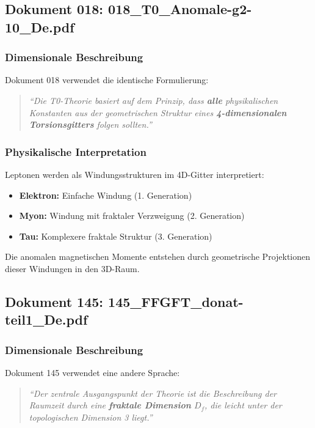 	\subsection{Dokument 018: 018\_T0\_Anomale-g2-10\_De.pdf}
	
	\subsubsection{Dimensionale Beschreibung}
	
	Dokument 018 verwendet die identische Formulierung:
	
	\begin{quote}
		\textit{\enquote{Die T0-Theorie basiert auf dem Prinzip, dass \textbf{alle} physikalischen Konstanten aus der geometrischen Struktur eines \textbf{4-dimensionalen Torsionsgitters} folgen sollten.}}
	\end{quote}
	
	\subsubsection{Physikalische Interpretation}
	
	Leptonen werden als Windungsstrukturen im 4D-Gitter interpretiert:
	\begin{itemize}
		\item \textbf{Elektron:} Einfache Windung (1. Generation)
		\item \textbf{Myon:} Windung mit fraktaler Verzweigung (2. Generation)
		\item \textbf{Tau:} Komplexere fraktale Struktur (3. Generation)
	\end{itemize}
	
	Die anomalen magnetischen Momente entstehen durch geometrische Projektionen dieser Windungen in den 3D-Raum.
	
	\subsection{Dokument 145: 145\_FFGFT\_donat-teil1\_De.pdf}
	
	\subsubsection{Dimensionale Beschreibung}
	
	Dokument 145 verwendet eine andere Sprache:
	
	\begin{quote}
		\textit{\enquote{Der zentrale Ausgangspunkt der Theorie ist die Beschreibung der Raumzeit durch eine \textbf{fraktale Dimension} $D_f$, die leicht unter der topologischen Dimension 3 liegt.}}
	\end{quote}
	
